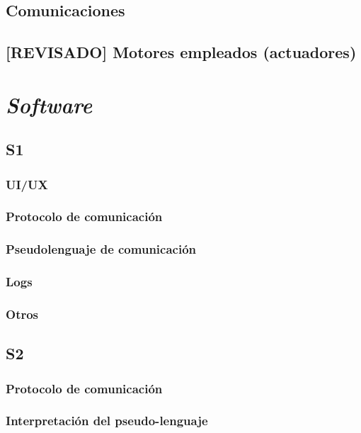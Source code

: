 \section{Comunicaciones}

\section{[REVISADO] Motores empleados (actuadores)}


\chapter{\textit{Software}}
\label{chap:software}

\section{S1}

\subsection{UI/UX}

\subsection{Protocolo de comunicación}

\subsection{Pseudolenguaje de comunicación}

\subsection{Logs}

\subsection{Otros}

\section{S2}

\subsection{Protocolo de comunicación}

\subsection{Interpretación del pseudo-lenguaje}

